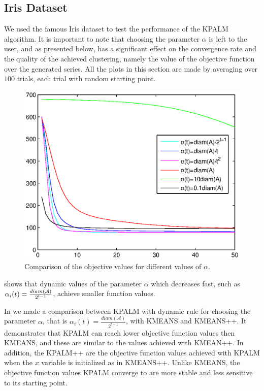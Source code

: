 \documentclass[11pt]{article}
\numberwithin{equation}{section}
\begin{document}
\subsection{Iris Dataset}
We used the famous Iris dataset to test the performance of the KPALM algorithm. It is important to note that choosing the parameter $\alpha$ is left to the user, and as presented below, has a significant effect on the convergence rate and the quality of the achieved clustering, namely the value of the objective function over the generated series. All the plots in this section are made by averaging over $100$ trials, each trial with random starting point.

\begin{figure}[h]
    \centering
    \includegraphics{dynamic_alpha_kpalm}
    \caption{Comparison of the objective values for different values of $\alpha$.}
    \label{fig:dynamic_alpha_psi_comp}
\end{figure} 

 shows that dynamic values of the parameter $\alpha$ which decreases fast, such as $\alpha_i(t)=\\\frac{diam(\mathcal{A})}{2^{t-1}}$, achieve smaller function values.

In  we made a comparison between KPALM with dynamic rule for choosing the parameter $\alpha$, that is $\alpha_i(t)=\frac{diam(\mathcal{A})}{2^{t-1}}$, with KMEANS and KMEANS++. It demonstrates that KPALM can reach lower objective function values then KMEANS, and these are similar to the values achieved with KMEAN++. In addition, the KPALM++ are the objective function values achieved with KPALM when the $x$ variable is initialized as in KMEANS++. Unlike KMEANS, the objective function values KPALM converge to are more stable and less sensitive to its starting point.
\end{document}
